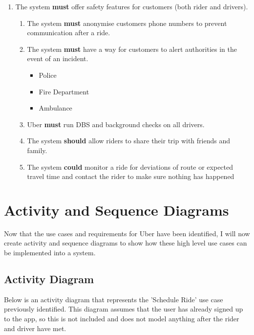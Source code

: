 \documentclass{article}
\begin{document}
\begin{enumerate}
      \vspace{.5cm}
      \item The system \textbf{must} offer safety features for customers (both rider and drivers).
      \begin{enumerate}[label=4.\arabic{*}]
        \item The system \textbf{must} anonymise customers phone numbers to prevent communication after a ride.
        \item The system \textbf{must} have a way for customers to alert authorities in the event of an incident.
        \begin{itemize}
          \item Police
          \item Fire Department
          \item Ambulance
        \end{itemize}
        \item Uber \textbf{must} run DBS and background checks on all drivers.
        \item The system \textbf{should} allow riders to share their trip with friends and family.
        \item The system \textbf{could} monitor a ride for deviations of route or expected travel time and contact the rider to make sure nothing has happened
      \end{enumerate}
    \end{enumerate}

    \newpage
    \section{Activity and Sequence Diagrams}
    Now that the use cases and requirements for Uber have been identified, I will now create activity and sequence diagrams to show how these high
    level use cases can be implemented into a system. 
    
    \subsection{Activity Diagram}

    Below is an activity diagram that represents the 'Schedule Ride' use case previously identified.
    This diagram assumes that the user has already signed up to the app, so this is not included and does not model anything after the rider and driver have met.
\end{document}
